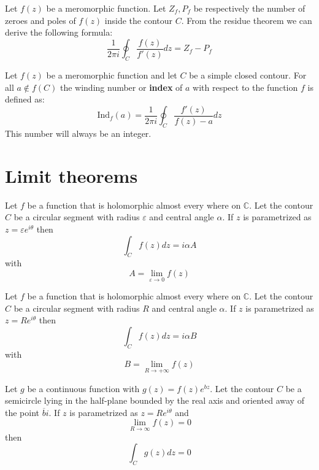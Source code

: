 	\begin{formula}
		Let $f(z)$ be a meromorphic function. Let $Z_f, P_f$ be respectively the number of zeroes and poles of $f(z)$ inside the contour $C$. From the residue theorem we can derive the following formula:
		\begin{equation}
			\frac{1}{2\pi i}\oint_C\frac{f(z)}{f'(z)}dz = Z_f - P_f
		\end{equation}
	\end{formula}
	\begin{formula}
		Let $f(z)$ be a meromorphic function and let $C$ be a simple closed contour. For all $a\not\in f(C)$ the winding number or \textbf{index} of $a$ with respect to the function $f$ is defined as:
		\begin{equation}
			\text{Ind}_f(a) = \frac{1}{2\pi i}\oint_C\frac{f'(z)}{f(z) - a}dz
		\end{equation}
		This number will always be an integer.
	\end{formula}

\section{Limit theorems}

    	\begin{theorem}\label{complexcalculus:theorem:small_limit}
		Let $f$ be a function that is holomorphic almost every where on $\mathbb{C}$. Let the contour $C$ be a circular segment with radius $\varepsilon$ and central angle $\alpha$.
		If $z$ is parametrized as $z = \varepsilon e^{i\theta}$ then\[\int_Cf(z)dz = i\alpha A\] with \[A = \lim_{\varepsilon\rightarrow0}f(z)\]
	\end{theorem}
	
        \begin{theorem}\label{complexcalculus:theorem:great_limit}
		Let $f$ be a function that is holomorphic almost every where on $\mathbb{C}$. Let the contour $C$ be a circular segment with radius $R$ and central angle $\alpha$. If $z$ is parametrized as $z = Re^{i\theta}$ then\[\int_Cf(z)dz = i\alpha B\] with \[B = \lim_{R\rightarrow+\infty}f(z)\]
	\end{theorem}
	
        \begin{theorem}\label{complexcalculus:theorem:jordan}
		Let $g$ be a continuous function with $g(z) = f(z)e^{bz}$. Let the contour $C$ be a semicircle lying in the half-plane bounded by the real axis and oriented away of the point $\overline{b}i$. If $z$ is parametrized as $z=Re^{i\theta}$ and \[\lim_{R\rightarrow\infty}f(z) = 0\] then\[\int_Cg(z)dz = 0\]
	\end{theorem}
		
